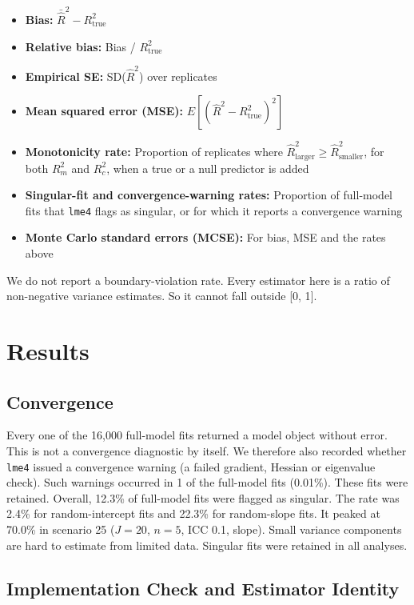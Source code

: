 \documentclass[
  11pt,
]{article}
\providecommand{\tightlist}{%
  \setlength{\itemsep}{0pt}\setlength{\parskip}{0pt}}
\begin{document}
\begin{itemize}
\tightlist
\item
  \textbf{Bias:} \(\bar{\hat{R}}^2 - R^2_{\text{true}}\)
\item
  \textbf{Relative bias:} Bias / \(R^2_{\text{true}}\)
\item
  \textbf{Empirical SE:} SD(\(\hat{R}^2\)) over replicates
\item
  \textbf{Mean squared error (MSE):} \(E[(\hat{R}^2 - R^2_{\text{true}})^2]\)
\item
  \textbf{Monotonicity rate:} Proportion of replicates where
  \(\hat{R}^2_{\text{larger}} \geq \hat{R}^2_{\text{smaller}}\),
  for both \(R^2_m\) and \(R^2_c\), when a true or a null predictor
  is added
\item
  \textbf{Singular-fit and convergence-warning rates:} Proportion of
  full-model fits that \texttt{lme4} flags as singular, or for which it
  reports a convergence warning
\item
  \textbf{Monte Carlo standard errors (MCSE):} For bias, MSE and
  the rates above
\end{itemize}

We do not report a boundary-violation rate. Every estimator here
is a ratio of non-negative variance estimates. So it cannot fall
outside {[}0, 1{]}.

\section{Results}\label{results}

\subsection{Convergence}\label{convergence}

Every one of the 16,000
full-model fits returned a model object without error. This is
not a convergence diagnostic by itself. We therefore also
recorded whether \texttt{lme4} issued a convergence warning (a failed
gradient, Hessian or eigenvalue check). Such warnings occurred in
1 of the full-model fits (0.01\%). These fits were
retained. Overall, 12.3\% of full-model fits were
flagged as singular. The rate was 2.4\%
for random-intercept fits and 22.3\% for
random-slope fits. It peaked at 70.0\% in
scenario 25 (\(J = 20\),
\(n = 5\), ICC 0.1,
slope). Small variance components are hard to
estimate from limited data. Singular fits were retained in all
analyses.

\subsection{Implementation Check and Estimator Identity}\label{implementation-check-and-estimator-identity}
\end{document}
